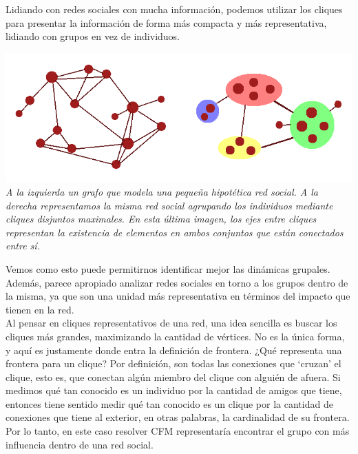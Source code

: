 Lidiando con redes sociales con mucha información, podemos utilizar los cliques para presentar la información de forma más compacta y más representativa, lidiando con grupos en vez de individuos. \\

\vspace{-1cm}
\begin{center}
	\includegraphics[scale=0.9]{informe/imgs/example.png}
	\textit{A la izquierda un grafo que modela una pequeña hipotética red social. A la derecha representamos la misma red social agrupando los individuos mediante cliques disjuntos maximales. En esta última imagen, los ejes entre cliques representan la existencia de elementos en ambos conjuntos que están conectados entre sí.}
\end{center}

Vemos como esto puede permitirnos identificar mejor las dinámicas grupales. Además, parece apropiado analizar redes sociales en torno a los grupos dentro de la misma, ya que son una unidad más representativa en términos del impacto que tienen en la red. \\

Al pensar en cliques representativos de una red, una idea sencilla es buscar los cliques más grandes, maximizando la cantidad de vértices. No es la única forma, y aquí es justamente donde entra la definición de frontera. ¿Qué representa una frontera para un clique? Por definición, son todas las conexiones que `cruzan' el clique, esto es, que conectan algún miembro del clique con alguién de afuera. Si medimos qué tan conocido es un individuo por la cantidad de amigos que tiene, entonces tiene sentido medir qué tan conocido es un clique por la cantidad de conexiones que tiene al exterior, en otras palabras, la cardinalidad de su frontera. Por lo tanto, en este caso resolver CFM representaría encontrar el grupo con más influencia dentro de una red social. \\